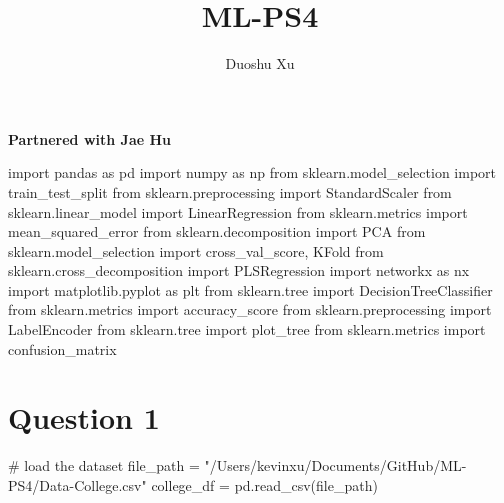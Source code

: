 \documentclass[
  letterpaper,
  DIV=11,
  numbers=noendperiod]{scrartcl}
\title{ML-PS4}
\author{Duoshu Xu}
\date{}
\newenvironment{Shaded}{\begin{snugshade}}{\end{snugshade}}
\newcommand{\CommentTok}[1]{\textcolor[rgb]{0.37,0.37,0.37}{#1}}
\newcommand{\ImportTok}[1]{\textcolor[rgb]{0.00,0.46,0.62}{#1}}
\newcommand{\NormalTok}[1]{\textcolor[rgb]{0.00,0.23,0.31}{#1}}
\newcommand{\OperatorTok}[1]{\textcolor[rgb]{0.37,0.37,0.37}{#1}}
\newcommand{\StringTok}[1]{\textcolor[rgb]{0.13,0.47,0.30}{#1}}
\begin{document}
\maketitle



\textbf{Partnered with Jae Hu}

\begin{Shaded}
\begin{Highlighting}[]
\ImportTok{import}\NormalTok{ pandas }\ImportTok{as}\NormalTok{ pd}
\ImportTok{import}\NormalTok{ numpy }\ImportTok{as}\NormalTok{ np}
\ImportTok{from}\NormalTok{ sklearn.model\_selection }\ImportTok{import}\NormalTok{ train\_test\_split}
\ImportTok{from}\NormalTok{ sklearn.preprocessing }\ImportTok{import}\NormalTok{ StandardScaler}
\ImportTok{from}\NormalTok{ sklearn.linear\_model }\ImportTok{import}\NormalTok{ LinearRegression}
\ImportTok{from}\NormalTok{ sklearn.metrics }\ImportTok{import}\NormalTok{ mean\_squared\_error}
\ImportTok{from}\NormalTok{ sklearn.decomposition }\ImportTok{import}\NormalTok{ PCA}
\ImportTok{from}\NormalTok{ sklearn.model\_selection }\ImportTok{import}\NormalTok{ cross\_val\_score, KFold}
\ImportTok{from}\NormalTok{ sklearn.cross\_decomposition }\ImportTok{import}\NormalTok{ PLSRegression}
\ImportTok{import}\NormalTok{ networkx }\ImportTok{as}\NormalTok{ nx}
\ImportTok{import}\NormalTok{ matplotlib.pyplot }\ImportTok{as}\NormalTok{ plt}
\ImportTok{from}\NormalTok{ sklearn.tree }\ImportTok{import}\NormalTok{ DecisionTreeClassifier}
\ImportTok{from}\NormalTok{ sklearn.metrics }\ImportTok{import}\NormalTok{ accuracy\_score}
\ImportTok{from}\NormalTok{ sklearn.preprocessing }\ImportTok{import}\NormalTok{ LabelEncoder}
\ImportTok{from}\NormalTok{ sklearn.tree }\ImportTok{import}\NormalTok{ plot\_tree}
\ImportTok{from}\NormalTok{ sklearn.metrics }\ImportTok{import}\NormalTok{ confusion\_matrix}
\end{Highlighting}
\end{Shaded}

\section{Question 1}\label{question-1}

\begin{Shaded}
\begin{Highlighting}[]
\CommentTok{\# load the dataset}
\NormalTok{file\_path }\OperatorTok{=} \StringTok{"/Users/kevinxu/Documents/GitHub/ML{-}PS4/Data{-}College.csv"}
\NormalTok{college\_df }\OperatorTok{=}\NormalTok{ pd.read\_csv(file\_path)}
\end{Highlighting}
\end{Shaded}
\end{document}
